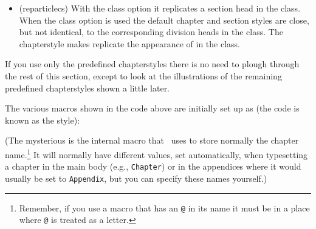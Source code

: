 \begin{itemize}
\item[\cstyle{reparticle}]
\glossary(reparticlecs)%
  {}%
  {With the  class option it replicates a section head in 
   the  class.}
   When the  class option is used
    the default chapter and section styles are close, but not
    identical, to the corresponding division heads in the 
    class. The  chapterstyle makes \cmd{\chapter}
    replicate the appearance of \cmd{\section} in the 
    class.

\end{itemize}

    If you use only the predefined chapterstyles there is no need to
plough through the rest of this section, except to look at the illustrations
of the remaining predefined chapterstyles shown a little later.

The various macros shown in the  code above are initially 
set up as (the code is known as the  style): 
\begin{lcode}
\newcommand{\chapterheadstart}{\vspace*{\beforechapskip}}
\newcommand{\printchaptername}{\chapnamefont \@chapapp}
\newcommand{\chapternamenum}{\space}
\newcommand{\printchapternum}{\chapnumfont \thechapter}
\newcommand{\afterchapternum}{\par\nobreak\vskip \midchapskip}
\newcommand{\printchapternonum}{}
\newcommand{\printchaptertitle}[1]{\chaptitlefont #1}
\newcommand{\afterchaptertitle}{\par\nobreak\vskip \afterchapskip}
\newcommand{\chapnamefont}{\normalfont\huge\bfseries}
\newcommand{\chapnumfont}{\normalfont\huge\bfseries}
\newcommand{\chaptitlefont}{\normalfont\Huge\bfseries}
\setlength{\beforechapskip}{50pt}
\setlength{\midchapskip}{20pt}
\setlength{\afterchapskip}{40pt}
\end{lcode}
(The mysterious \cmd{\@chapapp} is the internal macro that \ltx\ uses
to store normally the chapter name.\footnote{Remember, if you use
a macro that has an \texttt{@} in its name it must be in a place
where \texttt{@} is treated as a letter.} It will normally have 
different values,
set automatically, when typesetting a chapter in the main body 
(e.g., \texttt{Chapter}) or in the appendices where
it would usually be set to \texttt{Appendix}, but you can specify
these names yourself.)



